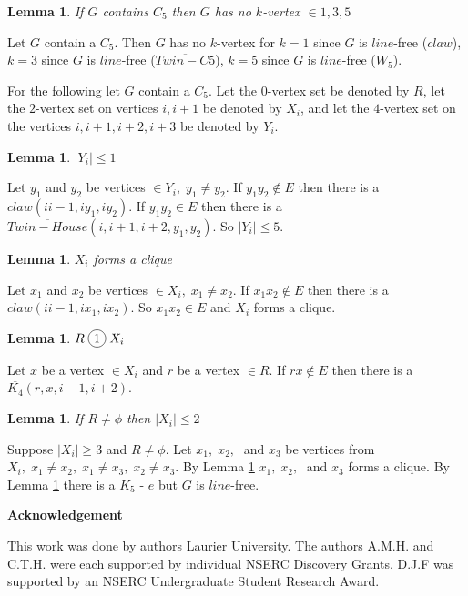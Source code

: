 \documentclass[12pt]{article}
\newcommand*\circled[1]{\tikz[baseline=(char.base)]{
            \node[shape=circle,draw,inner sep=2pt] (char) {#1};}}
\newtheorem{Lemma}[Theorem]{Lemma}
\begin{document}
\begin{Lemma}\label{lem:c5-kvertex}
If $G$ contains $C_5$ then $G$ has no $k$-vertex $\in {1,3,5}$
\end{Lemma}
 Let $G$ contain a $C_5$. Then $G$ has no $k$-vertex for $k = 1$ since $G$ is $line$-free ($claw$), $k = 3$ since $G$ is $line$-free ($\overline{Twin-C5}$), $k = 5$ since $G$ is $line$-free ($W_5$). 

For the following let $G$ contain a $C_5$. Let the $0$-vertex set be denoted by $R$, let the $2$-vertex set on vertices $i, i+1$ be denoted by $X_i$, and let the $4$-vertex set on the vertices $i, i+1, i+2, i+3$ be denoted by $Y_i$. 

\begin{Lemma}\label{lem:c5-4vertex-bounded}
$|Y_i| \leq 1$
\end{Lemma}
 Let $y_1$ and $y_2$ be vertices $\in Y_i,\; y_1 \neq y_2$. If $y_1y_2 \not \in E$ then there is a $claw (ii-1, iy_1,iy_2)$. If $y_1y_2 \in E$ then there is a $\overline{Twin-House} (i,i+1,i+2,y_1,y_2)$. So $|Y_i| \leq 5$.

\begin{Lemma}\label{lem:xi-clique}
$X_i$ forms a clique
\end{Lemma}
 Let $x_1$ and $x_2$ be vertices $\in X_i,\; x_1 \neq x_2$. If $x_1x_2 \not \in E$ then there is a $claw (ii-1, ix_1, ix_2)$. So $x_1x_2 \in E$ and $X_i$ forms a clique.

\begin{Lemma}\label{lem:r-join-xi}
$R \; \circled{1} \; X_i$
\end{Lemma}
 Let $x$ be a vertex $\in X_i$ and $r$ be a vertex $\in R$. If $rx \not \in E$ then there is a $\overline{K_4} (r, x, i-1, i+2)$.

\begin{Lemma}\label{lem:r-limis-xi}
If $R \neq \phi$ then $|X_i| \leq 2$
\end{Lemma}
 Suppose $|X_i| \geq 3$ and $R \neq \phi$. Let $x_1,\; x_2,\;$ and $x_3$ be vertices from $X_i,\; x_1 \neq x_2,\; x_1 \neq x_3,\; x_2 \neq x_3$. By Lemma \ref{lem:xi-clique} $x_1,\; x_2,\;$ and $x_3$ forms a clique. By Lemma \ref{lem:r-join-xi} there is a $K_5$ - $e$ but $G$ is $line$-free.


\begin{center}
{\bf Acknowledgement}
\end{center}
This work was done by authors  Laurier University. The authors A.M.H. and C.T.H. were each supported by individual NSERC Discovery Grants. D.J.F was supported by an NSERC Undergraduate Student Research Award.


\clearpage
\begin{thebibliography}{99}

\end{thebibliography}
\end{document}
